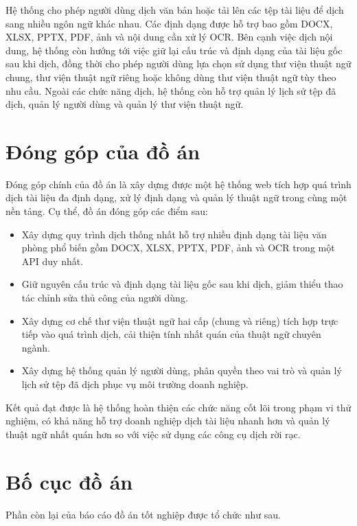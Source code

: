\documentclass[../DoAn.tex]{subfiles}
\begin{document}
Hệ thống cho phép người dùng dịch văn bản hoặc tải lên các tệp tài liệu để dịch sang nhiều ngôn ngữ khác nhau. Các định dạng được hỗ trợ bao gồm DOCX, XLSX, PPTX, PDF, ảnh và nội dung cần xử lý OCR. Bên cạnh việc dịch nội dung, hệ thống còn hướng tới việc giữ lại cấu trúc và định dạng của tài liệu gốc sau khi dịch, đồng thời cho phép người dùng lựa chọn sử dụng thư viện thuật ngữ chung, thư viện thuật ngữ riêng hoặc không dùng thư viện thuật ngữ tùy theo nhu cầu. Ngoài các chức năng dịch, hệ thống còn hỗ trợ quản lý lịch sử tệp đã dịch, quản lý người dùng và quản lý thư viện thuật ngữ. 

\section{Đóng góp của đồ án}
\label{section:1.4}

Đóng góp chính của đồ án là xây dựng được một hệ thống web tích hợp quá trình dịch tài liệu đa định dạng, xử lý định dạng và quản lý thuật ngữ trong cùng một nền tảng. Cụ thể, đồ án đóng góp các điểm sau:

\begin{itemize}
    \item Xây dựng quy trình dịch thống nhất hỗ trợ nhiều định dạng tài liệu văn phòng phổ biến gồm DOCX, XLSX, PPTX, PDF, ảnh và OCR trong một API duy nhất.
    \item Giữ nguyên cấu trúc và định dạng tài liệu gốc sau khi dịch, giảm thiểu thao tác chỉnh sửa thủ công của người dùng.
    \item Xây dựng cơ chế thư viện thuật ngữ hai cấp (chung và riêng) tích hợp trực tiếp vào quá trình dịch, cải thiện tính nhất quán của thuật ngữ chuyên ngành.
    \item Xây dựng hệ thống quản lý người dùng, phân quyền theo vai trò và quản lý lịch sử tệp đã dịch phục vụ môi trường doanh nghiệp.
\end{itemize}

Kết quả đạt được là hệ thống hoàn thiện các chức năng cốt lõi trong phạm vi thử nghiệm, có khả năng hỗ trợ doanh nghiệp dịch tài liệu nhanh hơn và quản lý thuật ngữ nhất quán hơn so với việc sử dụng các công cụ dịch rời rạc.

\section{Bố cục đồ án}
\label{section:1.5}

Phần còn lại của báo cáo đồ án tốt nghiệp được tổ chức như sau.
\end{document}
